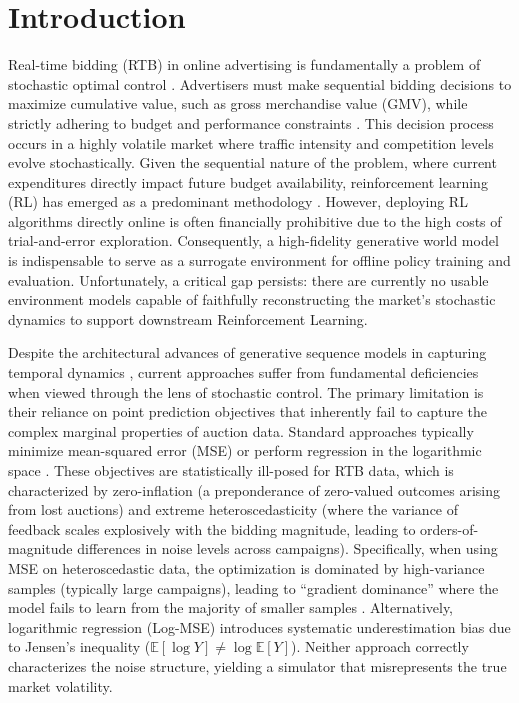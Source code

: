 \documentclass[sigconf, anonymous, review]{acmart}
\begin{document}

\maketitle

\section{Introduction}

Real-time bidding (RTB) in online advertising is fundamentally a problem of stochastic optimal control \cite{RNNControl, RLBid}. 
Advertisers must make sequential bidding decisions to maximize cumulative value, such as gross merchandise value (GMV), while strictly adhering to budget and performance constraints \cite{UnifiedSol}. 
This decision process occurs in a highly volatile market where traffic intensity and competition levels evolve stochastically.
Given the sequential nature of the problem, where current expenditures directly impact future budget availability, reinforcement learning (RL) has emerged as a predominant methodology \cite{RLBid}.
However, deploying RL algorithms directly online is often financially prohibitive due to the high costs of trial-and-error exploration. 
Consequently, a high-fidelity generative world model is indispensable to serve as a surrogate environment for offline policy training and evaluation.
Unfortunately, a critical gap persists: there are currently no usable environment models capable of faithfully reconstructing the market's stochastic dynamics to support downstream Reinforcement Learning.


Despite the architectural advances of generative sequence models in capturing temporal dynamics \cite{Bid2X,DiffBid}, current approaches suffer from fundamental deficiencies when viewed through the lens of stochastic control. 
The primary limitation is their reliance on point prediction objectives that inherently fail to capture the complex marginal properties of auction data. 
Standard approaches typically minimize mean-squared error (MSE) \cite{GAS,GAVE} or perform regression in the logarithmic space \cite{Bid2X,AIGB-Pearl}.
These objectives are statistically ill-posed for RTB data, which is characterized by zero-inflation (a preponderance of zero-valued outcomes arising from lost auctions) and extreme heteroscedasticity (where the variance of feedback scales explosively with the bidding magnitude, leading to orders-of-magnitude differences in noise levels across campaigns).
Specifically, when using MSE on heteroscedastic data, the optimization is dominated by high-variance samples (typically large campaigns), leading to ``gradient dominance'' where the model fails to learn from the majority of smaller samples \cite{kendall2017what}. 
Alternatively, logarithmic regression (Log-MSE) introduces systematic underestimation bias due to Jensen's inequality ($\mathbb{E}[\log Y] \neq \log \mathbb{E}[Y]$). 
Neither approach correctly characterizes the noise structure, yielding a simulator that misrepresents the true market volatility.
\end{document}
